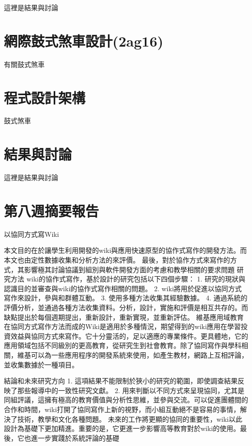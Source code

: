 \documentclass[]{article}
\begin{document}
這裡是結果與討論

\section{網際鼓式煞車設計(2ag16)}\label{ux7db2ux969bux9f13ux5f0fux715eux8ecaux8a2dux8a082ag16}

有關鼓式煞車

\section{程式設計架構}\label{ux7a0bux5f0fux8a2dux8a08ux67b6ux69cb-10}

鼓式煞車

\section{結果與討論}\label{ux7d50ux679cux8207ux8a0eux8ad6-10}

這裡是結果與討論

\section{第八週摘要報告}\label{ux7b2cux516bux9031ux6458ux8981ux5831ux544a}

以協同方式寫Wiki

本文目的在於讓學生利用開發的wiki與應用快速原型的協作式寫作的開發方法。而本文也由定性數據收集和分析方法的來評價。
最後，對於協作方式來寫作的方式，其影響極其討論協議到組別與軟件開發方面的考慮和教學相關的要求問題
研究方法 wiki的協作式寫作，基於設計的研究包括以下四個步驟： 1.
研究的現狀與認識目的並審查與wiki的協作式寫作相關的問題。 2.
wiki將用於促進以協同方式寫作來設計，參與和群體互動。 3.
使用多種方法收集其經驗數據。 4.
通過系統的評價分析，並通過各種方法收集資料。分析，設計，實施和評價是相互共存的。而缺點提出於每個週期提出，重新設計，重新實現，並重新評估。
維基應用域教育在協同方式寫作方法而成的Wiki是適用於多種情況，期望得到的wiki應用在學習投資效益與協同方式來寫作。它十分靈活的，足以適應的專業條件。更具體地，它的應用領域包括不同級別的更高教育，從研究生到社會教育。除了協同寫作與學科相關，維基可以為一些應用程序的開發系統來使用，如產生教材，網路上互相評論，並收集數據於一種項目。

結論和未來研究方向 1.
這項結果不能限制於狹小的研究的範圍，即使調查結果反映了那些報導中的一致性研究文獻。
2.
用來判斷以不同方式來呈現協同，尤其是同組評議，這擁有極高的教育價值與分析性思維，並參與交流。可以促進團體間的合作和時間，wiki打開了協同寫作上新的視野，而小組互動絕不是容易的事情，解決了技術，教學和文化各種問題。
未來的工作將更顯的協同的重要性，wiki以此設計為基礎下更加精進。重要的是，它更進一步影響高等教育對於wiki的使用。最後，它也進一步實踐於系統評論的基礎
\end{document}
